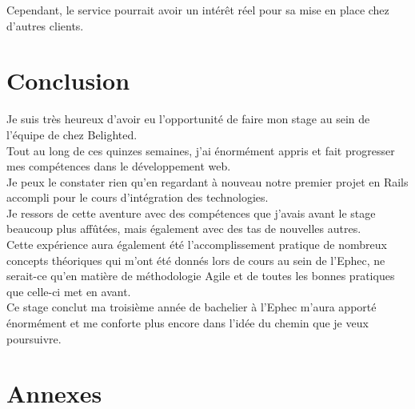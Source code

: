 \documentclass{report}
\begin{document}
        Cependant, le service pourrait avoir un intérêt réel pour sa mise en place chez d'autres clients.\\


\chapter{Conclusion}

  Je suis très heureux d'avoir eu l'opportunité de faire mon stage au sein de l'équipe de chez Belighted.\\

  Tout au long de ces quinzes semaines, j'ai énormément appris et fait progresser mes compétences dans le développement web.\\
  Je peux le constater rien qu'en regardant à nouveau notre premier projet en Rails accompli pour le cours d'intégration des technologies.\\

  Je ressors de cette aventure avec des compétences que j'avais avant le stage beaucoup plus affûtées, mais également avec des tas de nouvelles autres.\\
  Cette expérience aura également été l'accomplissement pratique de nombreux concepts théoriques qui m'ont été donnés lors de cours au sein de l'Ephec, ne serait-ce qu'en
  matière de méthodologie Agile et de toutes les bonnes pratiques que celle-ci met en avant.\\

  Ce stage conclut ma troisième année de bachelier à l'Ephec m'aura apporté énormément et me conforte plus encore dans l'idée du chemin que je veux poursuivre.\\

\chapter*{Annexes}
\end{document}
